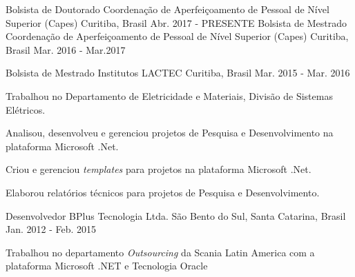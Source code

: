 

\begin{cventries}

   \cventry
	{Bolsista de Doutorado} %
	{Coordenação de Aperfeiçoamento de Pessoal de Nível Superior (Capes)} %
	{Curitiba, Brasil} %
	{Abr. 2017 - PRESENTE} %
	{
	}
  \cventry
    {Bolsista de Mestrado} %
    {Coordenação de Aperfeiçoamento de Pessoal de Nível Superior (Capes)} %
    {Curitiba, Brasil} %
    {Mar. 2016 - Mar.2017} %
    {
    }

  \cventry
    {Bolsista de Mestrado} %
    {Institutos LACTEC} %
    {Curitiba, Brasil} %
    {Mar. 2015 - Mar. 2016} %
    {
      \begin{cvitems} %
        \item {Trabalhou no Departamento de Eletricidade e Materiais, Divisão de Sistemas Elétricos.}
        \item {Analisou, desenvolveu e gerenciou projetos de Pesquisa e Desenvolvimento na plataforma Microsoft .Net.}
        \item {Criou e gerenciou \textit{templates} para projetos na plataforma Microsoft .Net.}
        \item {Elaborou relatórios técnicos para projetos de Pesquisa e Desenvolvimento.}
      \end{cvitems}
    }

  \cventry
    {Desenvolvedor} %
    {BPlus Tecnologia Ltda.} %
    {São Bento do Sul, Santa Catarina, Brasil} %
    {Jan. 2012 - Feb. 2015} %
    {
      \begin{cvitems} %
        \item {Trabalhou no departamento \textit{Outsourcing} da Scania Latin America com a plataforma Microsoft .NET e Tecnologia Oracle}
      \end{cvitems}
    }


\end{cventries}
